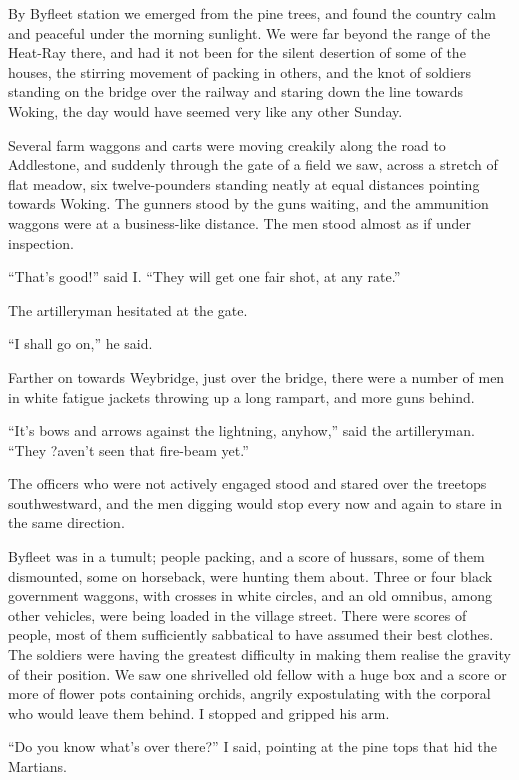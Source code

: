 By Byfleet station we emerged from the pine trees, and found the
country calm and peaceful under the morning sunlight. We were far
beyond the range of the Heat-Ray there, and had it not been for the
silent desertion of some of the houses, the stirring movement of
packing in others, and the knot of soldiers standing on the bridge
over the railway and staring down the line towards Woking, the day
would have seemed very like any other Sunday.

Several farm waggons and carts were moving creakily along the road
to Addlestone, and suddenly through the gate of a field we saw,
across a stretch of flat meadow, six twelve-pounders standing
neatly at equal distances pointing towards Woking. The gunners
stood by the guns waiting, and the ammunition waggons were at a
business-like distance. The men stood almost as if under
inspection.

``That's good!'' said I. ``They will get one fair shot, at any rate.''

The artilleryman hesitated at the gate.

``I shall go on,'' he said.

Farther on towards Weybridge, just over the bridge, there were a
number of men in white fatigue jackets throwing up a long rampart,
and more guns behind.

``It's bows and arrows against the lightning, anyhow,'' said the
artilleryman. ``They ?aven't seen that fire-beam yet.''

The officers who were not actively engaged stood and stared over
the treetops southwestward, and the men digging would stop every
now and again to stare in the same direction.

Byfleet was in a tumult; people packing, and a score of hussars,
some of them dismounted, some on horseback, were hunting them
about. Three or four black government waggons, with crosses in
white circles, and an old omnibus, among other vehicles, were being
loaded in the village street. There were scores of people, most of
them sufficiently sabbatical to have assumed their best clothes.
The soldiers were having the greatest difficulty in making them
realise the gravity of their position. We saw one shrivelled old
fellow with a huge box and a score or more of flower pots
containing orchids, angrily expostulating with the corporal who
would leave them behind. I stopped and gripped his arm.

``Do you know what's over there?'' I said, pointing at the pine tops
that hid the Martians.

